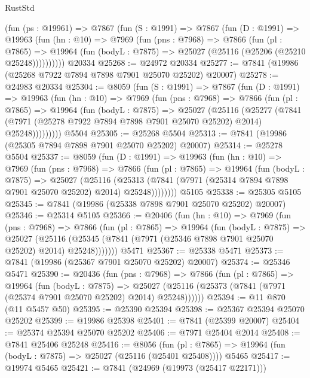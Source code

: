 \begin{lexlean}{RustStd}
\begin{coremodule}
{\begin{coremodule}
{{{{{{{{{{{{{{{{{{{{{{{{{{{{{{{{{{{{{{{{{{{{{{{{{{{{{{    (fun (ps : @19961) =>
    @7867
      (fun (S : @1991) =>
      @7867
        (fun (D : @1991) =>
        @19963
          (fun (hn : @10) =>
          @7969
            (fun (pns : @7968) =>
            @7866
              (fun (pl : @7865) =>
              @19964 (fun (bodyL : @7875) => @25027 (@25116 (@25206 (@25210 @25248))))))))))
    @20334
@25268 := @24972 @20334
@25277 := @7841 (@19986 (@25268 @7922 @7894 @7898 @7901 @25070 @25202) @20007)
@25278 := @24983 @20334
@25304 := @8059
    (fun (S : @1991) =>
    @7867
      (fun (D : @1991) =>
      @19963
        (fun (hn : @10) =>
        @7969
          (fun (pns : @7968) =>
          @7866
            (fun (pl : @7865) =>
            @19964
              (fun (bodyL : @7875) =>
              @25027
                (@25116
                  (@25277
                    (@7841
                      (@7971 (@25278 @7922 @7894 @7898 @7901 @25070 @25202) @2014)
                      @25248)))))))))
    @5504
@25305 := @25268 @5504
@25313 := @7841 (@19986 (@25305 @7894 @7898 @7901 @25070 @25202) @20007)
@25314 := @25278 @5504
@25337 := @8059
    (fun (D : @1991) =>
    @19963
      (fun (hn : @10) =>
      @7969
        (fun (pns : @7968) =>
        @7866
          (fun (pl : @7865) =>
          @19964
            (fun (bodyL : @7875) =>
            @25027
              (@25116
                (@25313 (@7841 (@7971 (@25314 @7894 @7898 @7901 @25070 @25202) @2014) @25248))))))))
    @5105
@25338 := @25305 @5105
@25345 := @7841 (@19986 (@25338 @7898 @7901 @25070 @25202) @20007)
@25346 := @25314 @5105
@25366 := @20406
    (fun (hn : @10) =>
    @7969
      (fun (pns : @7968) =>
      @7866
        (fun (pl : @7865) =>
        @19964
          (fun (bodyL : @7875) =>
          @25027
            (@25116 (@25345 (@7841 (@7971 (@25346 @7898 @7901 @25070 @25202) @2014) @25248)))))))
    @5471
@25367 := @25338 @5471
@25373 := @7841 (@19986 (@25367 @7901 @25070 @25202) @20007)
@25374 := @25346 @5471
@25390 := @20436
    (fun (pns : @7968) =>
    @7866
      (fun (pl : @7865) =>
      @19964
        (fun (bodyL : @7875) =>
        @25027 (@25116 (@25373 (@7841 (@7971 (@25374 @7901 @25070 @25202) @2014) @25248))))))
@25394 := @11 @870 (@11 @5457 @50)
@25395 := @25390 @25394
@25398 := @25367 @25394 @25070 @25202
@25399 := @19986 @25398
@25401 := @7841 (@25399 @20007)
@25404 := @25374 @25394 @25070 @25202
@25406 := @7971 @25404 @2014
@25408 := @7841 @25406 @25248
@25416 := @8056
    (fun (pl : @7865) => @19964 (fun (bodyL : @7875) => @25027 (@25116 (@25401 @25408))))
    @5465
@25417 := @19974 @5465
@25421 := @7841 (@24969 (@19973 (@25417 @22171)))
}}}}}}}}}}}}}}}}}}}}}}}}}}}}}}}}}}}}}}}}}}}}}}}}}}}}}}
\end{coremodule}}
\end{coremodule}
\end{lexlean}
